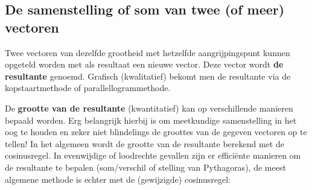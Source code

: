 \documentclass{ximera}
\begin{document}
\subsection*{De samenstelling of som van twee (of meer) vectoren}

Twee vectoren van dezelfde grootheid met hetzelfde aangrijpingspunt kunnen opgeteld worden met als resultaat een nieuwe vector. 
Deze vector wordt \textbf{de resultante} genoemd. 
Grafisch (kwalitatief) bekomt men de resultante via de kopstaartmethode of parallellogrammethode.  %

\begin{image}[0.4\textwidth]
\end{image}


De \textbf{grootte van de resultante} (kwantitatief) kan op verschillende manieren bepaald worden. 
Erg belangrijk hierbij is om meetkundige samenstelling in het oog te houden en zeker niet blindelings de groottes van de gegeven vectoren op te tellen! 
In het algemeen wordt de grootte van de resultante berekend met de cosinusregel. 
In evenwijdige of loodrechte gevallen zijn er efficiënte manieren om de resultante te bepalen (som/verschil of stelling van Pythagoras), de meest algemene methode is echter met de (gewijzigde) cosinusregel:
\end{document}
